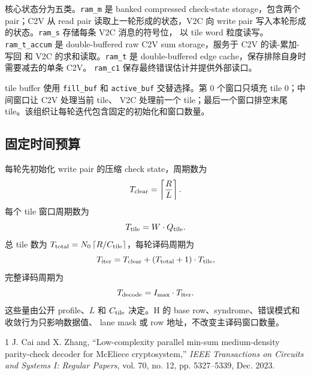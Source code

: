 \documentclass{article}
\begin{document}
核心状态分为五类。\texttt{ram\_m} 是 banked compressed check-state storage，包含两个 pair；C2V 从 read pair
读取上一轮形成的状态，V2C 向 write pair 写入本轮形成的状态。\texttt{ram\_s} 存储每条 V2C 消息的符号位，
以 tile word 粒度读写。\texttt{ram\_t\_accum} 是 double-buffered raw C2V sum storage，服务于 C2V 的读-累加-写回
和 V2C 的求和读取。\texttt{ram\_t} 是 double-buffered edge cache，保存排除自身时需要减去的单条 C2V。
\texttt{ram\_c1} 保存最终错误估计并提供外部读口。

tile buffer 使用 \texttt{fill\_buf} 和 \texttt{active\_buf} 交替选择。第 0 个窗口只填充 tile 0；中间窗口让 C2V 处理当前 tile、
V2C 处理前一个 tile；最后一个窗口排空末尾 tile。该组织让每轮迭代包含固定的初始化和窗口数量。

\subsection{固定时间预算}

每轮先初始化 write pair 的压缩 check state，周期数为
\[
  T_{\rm clear}=\left\lceil\frac{R}{L}\right\rceil .
\]
每个 tile 窗口周期数为
\[
  T_{\rm tile}=W\cdot Q_{\rm tile}.
\]
总 tile 数为 $T_{\rm total}=N_0\left\lceil R/C_{\rm tile}\right\rceil$，每轮译码周期为
\[
  T_{\rm iter}=T_{\rm clear}+(T_{\rm total}+1)\cdot T_{\rm tile},
\]
完整译码周期为
\[
  T_{\rm decode}=I_{\max}\cdot T_{\rm iter}.
\]
这些量由公开 profile、$L$ 和 $C_{\rm tile}$ 决定。H 的 base row、syndrome、错误模式和收敛行为只影响数据值、
lane mask 或 row 地址，不改变主译码窗口数量。
\fi

\begin{thebibliography}{1}
J. Cai and X. Zhang, ``Low-complexity parallel min-sum medium-density parity-check decoder for McEliece cryptosystem,''
\emph{IEEE Transactions on Circuits and Systems I: Regular Papers}, vol. 70, no. 12, pp. 5327--5339, Dec. 2023.
\end{thebibliography}
\end{document}

